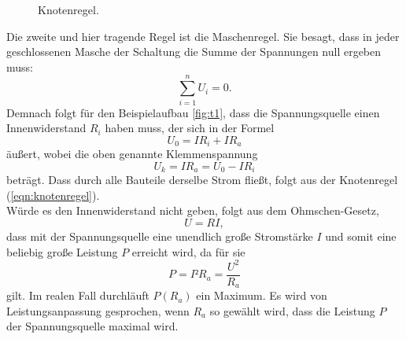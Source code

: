 \begin{figure}[H]
  \centering
  \caption{Knotenregel.}
  \label{fig:knotenregel}
\end{figure}

Die zweite und hier tragende Regel ist die Maschenregel.
Sie besagt, dass in jeder geschlossenen Masche der Schaltung die Summe der Spannungen null ergeben muss:
\begin{equation}
  \sum_{i=1}^n U_i = 0.
  \label{eqn:maschenregel}
\end{equation}
Demnach folgt für den Beispielaufbau \ref{fig:t1}, dass die Spannungsquelle einen Innenwiderstand $R_i$ haben muss, der sich in der Formel
\begin{equation}
  U_0 = IR_i + IR_a
\end{equation}
äußert, wobei die oben genannte Klemmenspannung
\begin{equation}
  U_k = IR_a = U_0 - IR_i
  \label{eqn:klemmspannung}
\end{equation}
beträgt.
Dass durch alle Bauteile derselbe Strom fließt, folgt aus der Knotenregel (\ref{eqn:knotenregel}).\\
Würde es den Innenwiderstand nicht geben, folgt aus dem Ohmschen-Gesetz,
\begin{equation}
  U = RI,
\end{equation}
dass mit der Spannungsquelle eine unendlich große Stromstärke $I$ und somit eine beliebig große Leistung $P$ erreicht wird, da für sie
\begin{equation}
  P = I²R_a = \frac{U^2}{R_a}
  \label{eqn:leistung}
\end{equation}
gilt.
Im realen Fall durchläuft $P(R_a)$ ein Maximum.
Es wird von Leistungsanpassung gesprochen, wenn $R_a$ so gewählt wird, dass die Leistung $P$ der Spannungsquelle maximal wird.
